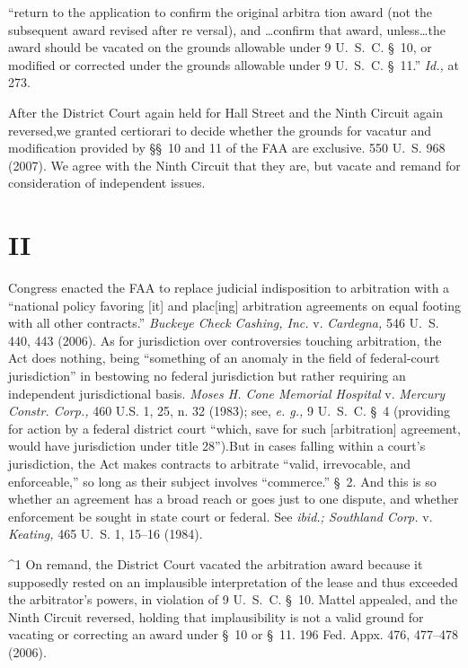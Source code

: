    ``return to the application to confirm the original arbitra tion
    award (not the subsequent award revised after re versal), and
   \dots confirm that award, unless\dots the award should be
    vacated on the grounds allowable under 9 U.~S.~C. \S~10, or
    modified or corrected under the grounds allowable under 9 U.~S.~C.
    \S~11.'' \emph{Id.,} at 273.

\noindent After the District Court again held for Hall Street and the Ninth
Circuit again reversed,\footnotemark[1] we granted certiorari to decide whether
the grounds for vacatur and modification provided by \S\S~10 and 11
of the FAA are exclusive. 550 U.~S. 968 (2007). We agree with the
Ninth Circuit that they are, but vacate and remand for consideration of
independent issues.

\section{II}

  Congress enacted the FAA to replace judicial indisposition to
arbitration with a ``national policy favoring [it] and plac[ing]
arbitration agreements on equal footing with all other contracts.''
\emph{Buckeye Check Cashing, Inc.} v. \emph{Cardegna,} 546 U.~S. 440, 443
(2006). As for jurisdiction over controversies touching arbitration,
the Act does nothing, being ``something of an anomaly in the field
of federal-court jurisdiction'' \newpage  in bestowing no federal
jurisdiction but rather requiring an independent jurisdictional basis.
\emph{Moses H. Cone Memorial Hospital} v. \emph{Mercury Constr. Corp.,}
460 U.S. 1, 25, n. 32 (1983); see, \emph{e. g.,} 9 U.~S.~C. \S~4
(providing for action by a federal district court ``which, save for
such [arbitration] agreement, would have jurisdiction under title
28'').\footnotemark[2] But in cases falling within a court's jurisdiction,
the Act makes contracts to arbitrate ``valid, irrevocable, and
enforceable,'' so long as their subject involves ``commerce.'' \S~2.
And this is so whether an agreement has a broad reach or goes just
to one dispute, and whether enforcement be sought in state court or
federal. See \emph{ibid.; Southland Corp.} v. \emph{Keating,} 465 U.~S. 1,
15--16 (1984).


^1 On remand, the District Court vacated the arbitration award because
it supposedly rested on an implausible interpretation of the lease and
thus exceeded the arbitrator's powers, in violation of 9 U.~S.~C.
\S~10. Mattel appealed, and the Ninth Circuit reversed, holding that
implausibility is not a valid ground for vacating or correcting an award
under \S~10 or \S~11. 196 Fed. Appx. 476, 477--478 (2006).


